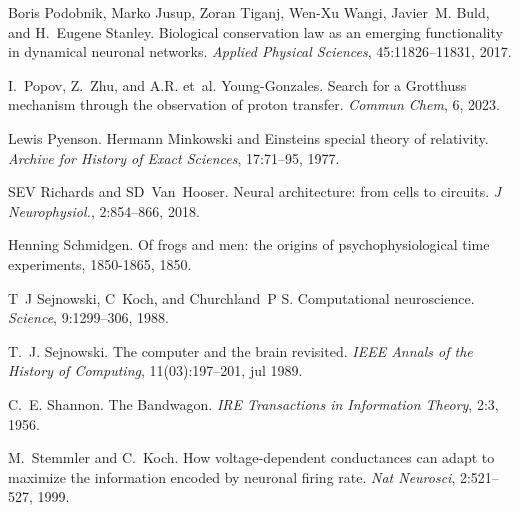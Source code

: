 \begin{DoxyDescription}
\item[\label{citelist_CITEREF_BiologicalConservationLaw:2017}%
\mbox{[}44\mbox{]}]Boris Podobnik, Marko Jusup, Zoran Tiganj, Wen-\/\+Xu Wangi, Javier~M. Buld, and H.~Eugene Stanley. Biological conservation law as an emerging functionality in dynamical neuronal networks. {\itshape Applied Physical Sciences}, 45\+:11826--11831, 2017. 


\item[\label{citelist_CITEREF_GrotthussMechanism:2023}%
\mbox{[}45\mbox{]}]I.~Popov, Z.~Zhu, and A.\+R. et~al. Young-\/\+Gonzales. Search for a Grotthuss mechanism through the observation of proton transfer. {\itshape Commun Chem}, 6, 2023. 


\item[\label{citelist_CITEREF_EinsteinMinkowskiRelativity:1977}%
\mbox{[}46\mbox{]}]Lewis Pyenson. Hermann Minkowski and Einstein\textquotesingle{}s special theory of relativity. {\itshape Archive for History of Exact Sciences}, 17\+:71--95, 1977. 


\item[\label{citelist_CITEREF_FromCellsToCircuits:2018}%
\mbox{[}47\mbox{]}]SEV Richards and SD~Van~Hooser. Neural architecture\+: from cells to circuits. {\itshape J Neurophysiol.}, 2\+:854--866, 2018. 


\item[\label{citelist_CITEREF_HelmholtzReport:1850}%
\mbox{[}48\mbox{]}]Henning Schmidgen. Of frogs and men\+: the origins of psychophysiological time experiments, 1850-\/1865, 1850.


\item[\label{citelist_CITEREF_SejnowskiComputationalNeuroscience:1988}%
\mbox{[}49\mbox{]}]T~J Sejnowski, C~Koch, and Churchland~P S. Computational neuroscience. {\itshape Science}, 9\+:1299--306, 1988. 


\item[\label{citelist_CITEREF_ComputerBrainSejnowski:1989}%
\mbox{[}50\mbox{]}]T.~J. Sejnowski. The computer and the brain revisited. {\itshape IEEE Annals of the History of Computing}, 11(03)\+:197--201, jul 1989. 


\item[\label{citelist_CITEREF_ShannonBandwagon:1956}%
\mbox{[}51\mbox{]}]C.~E. Shannon. The Bandwagon. {\itshape IRE Transactions in Information Theory}, 2\+:3, 1956.


\item[\label{citelist_CITEREF_KochVoltageDependentConductance:1999}%
\mbox{[}52\mbox{]}]M.~Stemmler and C.~Koch. How voltage-\/dependent conductances can adapt to maximize the information encoded by neuronal firing rate. {\itshape Nat Neurosci}, 2\+:521--527, 1999.



\end{DoxyDescription}
